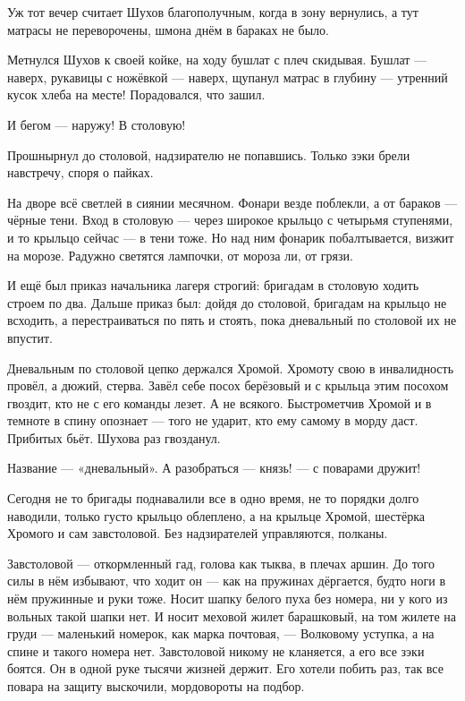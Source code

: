 Уж тот вечер считает Шухов благополучным, когда в зону вернулись, а тут матрасы не
переворочены, шмона днём в бараках не было.

Метнулся Шухов к своей койке, на ходу бушлат с плеч скидывая. Бушлат --- наверх, рукавицы с
ножёвкой --- наверх, щупанул матрас в глубину --- утренний кусок хлеба на месте! Порадовался,
что зашил.

И бегом --- наружу! В столовую!

Прошнырнул до столовой, надзирателю не попавшись. Только зэки брели навстречу, споря о
пайках.

На дворе всё светлей в сиянии месячном. Фонари везде поблекли, а от бараков --- чёрные тени.
Вход в столовую --- через широкое крыльцо с четырьмя ступенями, и то крыльцо сейчас --- в тени
тоже. Но над ним фонарик побалтывается, визжит на морозе. Радужно светятся лампочки, от
мороза ли, от грязи.

И ещё был приказ начальника лагеря строгий: бригадам в столовую ходить строем по два. Дальше
приказ был: дойдя до столовой, бригадам на крыльцо не всходить, а перестраиваться по пять и
стоять, пока дневальный по столовой их не впустит.

Дневальным по столовой цепко держался Хромой. Хромоту свою в инвалидность провёл, а дюжий,
стерва. Завёл себе посох берёзовый и с крыльца этим посохом гвоздит, кто не с его команды
лезет. А не всякого. Быстрометчив Хромой и в темноте в спину опознает --- того не ударит, кто
ему самому в морду даст. Прибитых бьёт. Шухова раз гвозданул.

Название --- «дневальный». А разобраться --- князь! --- с поварами дружит!

Сегодня не то бригады поднавалили все в одно время, не то порядки долго наводили, только
густо крыльцо облеплено, а на крыльце Хромой, шестёрка Хромого и сам завстоловой. Без
надзирателей управляются, полканы.

Завстоловой --- откормленный гад, голова как тыква, в плечах аршин. До того силы в нём
избывают, что ходит он --- как на пружинах дёргается, будто ноги в нём пружинные и руки тоже.
Носит шапку белого пуха без номера, ни у кого из вольных такой шапки нет. И носит меховой
жилет барашковый, на том жилете на груди --- маленький номерок, как марка почтовая, ---
Волковому уступка, а на спине и такого номера нет. Завстоловой никому не кланяется, а его все
зэки боятся. Он в одной руке тысячи жизней держит. Его хотели побить раз, так все повара на
защиту выскочили, мордовороты на подбор.

